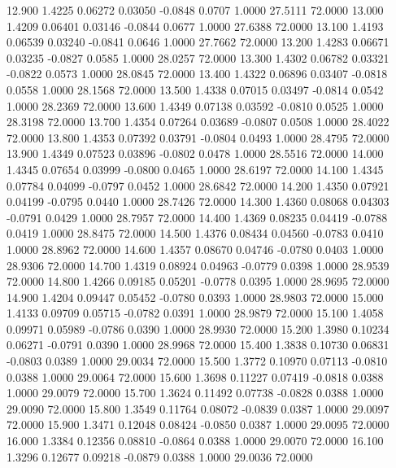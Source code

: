   12.900   1.4225   0.06272   0.03050  -0.0848   0.0707   1.0000  27.5111  72.0000
  13.000   1.4209   0.06401   0.03146  -0.0844   0.0677   1.0000  27.6388  72.0000
  13.100   1.4193   0.06539   0.03240  -0.0841   0.0646   1.0000  27.7662  72.0000
  13.200   1.4283   0.06671   0.03235  -0.0827   0.0585   1.0000  28.0257  72.0000
  13.300   1.4302   0.06782   0.03321  -0.0822   0.0573   1.0000  28.0845  72.0000
  13.400   1.4322   0.06896   0.03407  -0.0818   0.0558   1.0000  28.1568  72.0000
  13.500   1.4338   0.07015   0.03497  -0.0814   0.0542   1.0000  28.2369  72.0000
  13.600   1.4349   0.07138   0.03592  -0.0810   0.0525   1.0000  28.3198  72.0000
  13.700   1.4354   0.07264   0.03689  -0.0807   0.0508   1.0000  28.4022  72.0000
  13.800   1.4353   0.07392   0.03791  -0.0804   0.0493   1.0000  28.4795  72.0000
  13.900   1.4349   0.07523   0.03896  -0.0802   0.0478   1.0000  28.5516  72.0000
  14.000   1.4345   0.07654   0.03999  -0.0800   0.0465   1.0000  28.6197  72.0000
  14.100   1.4345   0.07784   0.04099  -0.0797   0.0452   1.0000  28.6842  72.0000
  14.200   1.4350   0.07921   0.04199  -0.0795   0.0440   1.0000  28.7426  72.0000
  14.300   1.4360   0.08068   0.04303  -0.0791   0.0429   1.0000  28.7957  72.0000
  14.400   1.4369   0.08235   0.04419  -0.0788   0.0419   1.0000  28.8475  72.0000
  14.500   1.4376   0.08434   0.04560  -0.0783   0.0410   1.0000  28.8962  72.0000
  14.600   1.4357   0.08670   0.04746  -0.0780   0.0403   1.0000  28.9306  72.0000
  14.700   1.4319   0.08924   0.04963  -0.0779   0.0398   1.0000  28.9539  72.0000
  14.800   1.4266   0.09185   0.05201  -0.0778   0.0395   1.0000  28.9695  72.0000
  14.900   1.4204   0.09447   0.05452  -0.0780   0.0393   1.0000  28.9803  72.0000
  15.000   1.4133   0.09709   0.05715  -0.0782   0.0391   1.0000  28.9879  72.0000
  15.100   1.4058   0.09971   0.05989  -0.0786   0.0390   1.0000  28.9930  72.0000
  15.200   1.3980   0.10234   0.06271  -0.0791   0.0390   1.0000  28.9968  72.0000
  15.400   1.3838   0.10730   0.06831  -0.0803   0.0389   1.0000  29.0034  72.0000
  15.500   1.3772   0.10970   0.07113  -0.0810   0.0388   1.0000  29.0064  72.0000
  15.600   1.3698   0.11227   0.07419  -0.0818   0.0388   1.0000  29.0079  72.0000
  15.700   1.3624   0.11492   0.07738  -0.0828   0.0388   1.0000  29.0090  72.0000
  15.800   1.3549   0.11764   0.08072  -0.0839   0.0387   1.0000  29.0097  72.0000
  15.900   1.3471   0.12048   0.08424  -0.0850   0.0387   1.0000  29.0095  72.0000
  16.000   1.3384   0.12356   0.08810  -0.0864   0.0388   1.0000  29.0070  72.0000
  16.100   1.3296   0.12677   0.09218  -0.0879   0.0388   1.0000  29.0036  72.0000
